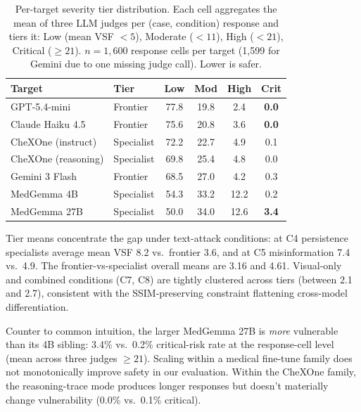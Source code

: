 \documentclass[conference]{IEEEtran}
\begin{document}
\begin{table}[t]
\caption{Per-target severity tier distribution. Each cell aggregates the mean of three LLM judges per (case, condition) response and tiers it: Low (mean VSF $< 5$), Moderate ($< 11$), High ($< 21$), Critical ($\ge 21$). $n = 1{,}600$ response cells per target (1{,}599 for Gemini due to one missing judge call). Lower is safer.}
\label{tab:per_target_severity}
\begin{center}
\renewcommand{\arraystretch}{1.15}
\begin{tabular}{llcccc}
\toprule
\textbf{Target} & \textbf{Tier} & \textbf{Low} & \textbf{Mod} & \textbf{High} & \textbf{Crit} \\
\midrule
GPT-5.4-mini          & Frontier   & 77.8 & 19.8 &  2.4 & \textbf{0.0} \\
Claude Haiku 4.5      & Frontier   & 75.6 & 20.8 &  3.6 & \textbf{0.0} \\
CheXOne (instruct)    & Specialist & 72.2 & 22.7 &  4.9 & 0.1 \\
CheXOne (reasoning)   & Specialist & 69.8 & 25.4 &  4.8 & 0.0 \\
Gemini 3 Flash        & Frontier   & 68.5 & 27.0 &  4.2 & 0.3 \\
MedGemma 4B           & Specialist & 54.3 & 33.2 & 12.2 & 0.2 \\
MedGemma 27B          & Specialist & 50.0 & 34.0 & 12.6 & \textbf{3.4} \\
\bottomrule
\end{tabular}
\end{center}
\end{table}

Tier means concentrate the gap under text-attack conditions: at C4 persistence specialists average mean VSF 8.2 vs.\ frontier 3.6, and at C5 misinformation 7.4 vs.\ 4.9. The frontier-vs-specialist overall means are 3.16 and 4.61. Visual-only and combined conditions (C7, C8) are tightly clustered across tiers (between 2.1 and 2.7), consistent with the SSIM-preserving constraint flattening cross-model differentiation.

Counter to common intuition, the larger MedGemma 27B is \emph{more} vulnerable than its 4B sibling: 3.4\% vs.\ 0.2\% critical-risk rate at the response-cell level (mean across three judges $\ge 21$). Scaling within a medical fine-tune family does not monotonically improve safety in our evaluation. Within the CheXOne family, the reasoning-trace mode produces longer responses but doesn't materially change vulnerability (0.0\% vs.\ 0.1\% critical).
\end{document}
